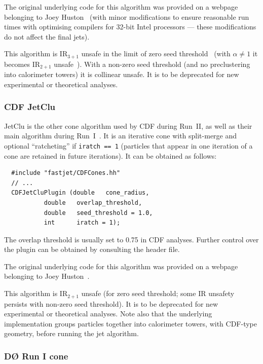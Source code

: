\documentclass[12pt,a4]{article}
\newcommand{\ttt}[1]{{\small\texttt{#1}}}
\newcommand{\Dzero}{D\O\xspace}
\begin{document}
The original underlying code for this algorithm was provided on a
webpage belonging to Joey Huston~\cite{CDFCones} (with minor
modifications to ensure reasonable run times with optimising compilers
for 32-bit Intel processors --- these modifications do not affect the
final jets).

This algorithm is IR$_{3+1}$ unsafe in the limit of zero seed
threshold~\cite{SISCone} (with $\alpha \neq 1$ it
becomes IR$_{2+1}$ unsafe~\cite{TeV4LHC}).
%
With a non-zero seed threshold (and no preclustering into calorimeter
towers) it is collinear unsafe.
%
It is to be
deprecated for new experimental or theoretical analyses.

\subsubsection{CDF JetClu}

JetClu is the other cone algorithm used by CDF during Run~II, as well
as their main algorithm during Run~I~\cite{Abe:1991ui}. 
%
It is an iterative cone with split-merge and optional ``ratcheting''
if \ttt{iratch == 1} (particles that appear in one iteration of a cone
are retained in future iterations).
%
It can be obtained as follows:
\begin{lstlisting}
  #include "fastjet/CDFCones.hh"
  // ...
  CDFJetCluPlugin (double   cone_radius, 
		   double   overlap_threshold, 
		   double   seed_threshold = 1.0,
		   int      iratch = 1);
\end{lstlisting}
%
The overlap threshold is usually set to 0.75 in CDF analyses.
%
Further control over the plugin can be obtained by consulting the
header file.

The original underlying code for this algorithm was provided on a
webpage belonging to Joey Huston~\cite{CDFCones}.

This algorithm is IR$_{2+1}$ unsafe (for zero seed threshold; some
IR unsafety persists with non-zero seed threshold). 
It is to be
deprecated for new experimental or theoretical analyses.
%
Note also that the underlying implementation groups particles together
into calorimeter towers, with CDF-type geometry, before running the
jet algorithm. 

\subsubsection{\Dzero Run I cone}
\end{document}
